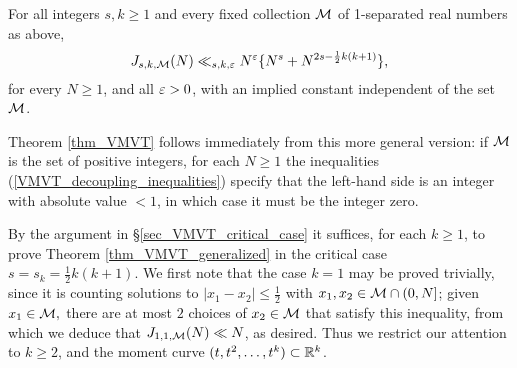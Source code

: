 \documentclass[brochure,english,12pt]{bourbaki}%
\begin{document}
\begin{theo}\label{thm_VMVT_generalized}
For all integers $s, k \geq 1$ and every fixed collection $\mathcal{M}$ of 1-separated real numbers  as above,
\[ 
J_{s,k,\mathcal{M}}(N) \ll_{s,k,\varepsilon}  N^\varepsilon \{ N^s + N^{2s - \frac{1}{2} k(k+1)} \},\]
for every $N \geq 1$, and all $\varepsilon>0$, with an implied constant  independent of the set $\mathcal{M}$.
\end{theo}
 Theorem \ref{thm_VMVT} follows immediately from this more general version: if $\mathcal{M}$ is the set of positive integers, for each $N \geq 1$ the inequalities (\ref{VMVT_decoupling_inequalities}) specify that the left-hand side is an integer with absolute value $< 1$, in which case it must be the integer zero.


By the argument in \S \ref{sec_VMVT_critical_case} it suffices, for each $k \geq 1$, to prove Theorem \ref{thm_VMVT_generalized} in the critical case $s=s_k = \frac{1}{2}k(k+1)$.
We first note that the case $k=1$ may be proved trivially, since it is counting solutions to $|x_1 -x_2| \leq \frac{1}{2}$ with $x_1,x_2  \in \mathcal{M} \cap (0,N]$; given $x_1 \in \mathcal{M},$ there are at most $2$ choices of $x_2 \in \mathcal{M}$ that satisfy this inequality, from which we deduce that $J_{1,1,\mathcal{M}}(N) \ll N$, as desired. Thus we restrict our attention to $k \geq 2$, and  the moment curve $(t,t^2,\ldots, t^k) \subset \mathbb{R}^k$.
\end{document}
